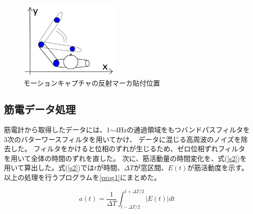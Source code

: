 \documentclass{jsarticle}
\begin{document}

\begin{figure}[htb]
  \begin{center}
    \includegraphics[width=5cm]{karada.png}
    \caption{モーションキャプチャの反射マーカ貼付位置}
    \label{karada2}
  \end{center}
\end{figure}


\subsection{筋電データ処理}
筋電計から取得したデータには、1$\sim$4Hzの通過領域をもつバンドパスフィルタを3次のバターワースフィルタを用いてかけ、
データに混じる高周波のノイズを除去した。
フィルタをかけると位相のずれが生じるため、ゼロ位相ずれフィルタを用いて全体の時間のずれを直した。
次に、筋活動量の時間変化を、式(\ref{s2})を用いて算出した。式(\ref{s2})では$t$が時間、$\Delta T$が窓区間、$E(t)$が筋活動度を示す。以上の処理を行うプログラムを\ref{prog1}にまとめた。



\begin{equation}
  a(t)=\frac{1}{\Delta T}\int_{t-\Delta T/2}^{t+\Delta T/2}|E(t)|dt 
  \label{s2}
\end{equation}
\end{document}
